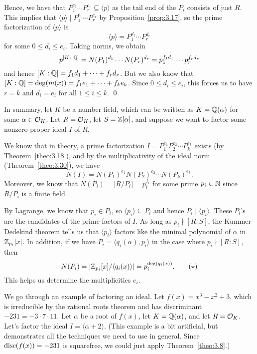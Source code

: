 \begin{pf}
    Hence, we have that $P_1^{e_1} \cdots P_r^{e_r} \subseteq \langle p \rangle$ 
    as the tail end of the $P_i$ consists of just $R$. This implies that 
    $\langle p \rangle \mid P_1^{e_1} \cdots P_r^{e_r}$ by Proposition~\ref{prop:3.17},
    so the prime factorization of $\langle p \rangle$ is 
    \[ \langle p \rangle = P_1^{d_1} \cdots P_r^{d_r} \] 
    for some $0 \leq d_i \leq e_i$. Taking norms, we obtain 
    \[ p^{[K\colon\mathbb{Q}]} = N(P_1)^{d_1} \cdots N(P_r)^{d_r} = p_1^{f_1d_1} \cdots p_r^{f_rd_r} \]  
    and hence $[K : \mathbb{Q}] = f_1d_1 + \cdots + f_rd_r$. But we also know that $[K : \mathbb{Q}] 
    = \deg(m(x)) = f_1e_1 + \cdots + f_ke_k$. Since $0 \leq d_i \leq e_i$, this forces us 
    to have $r = k$ and $d_i = e_i$ for all $1 \leq i \leq k$. \qed 
\end{pf}\vspace{-0.25cm}

In summary, let $K$ be a number field, which can be written as $K = \mathbb{Q}(\alpha)$ for some 
$\alpha \in {\cal O}_K$. Let $R = {\cal O}_K$, let $S = \mathbb{Z}[\alpha]$, and suppose 
we want to factor some nonzero proper ideal $I$ of $R$. 

We know that in theory, a prime factorization $I = P_1^{e_1} P_2^{e_2} \cdots P_k^{e_k}$ 
exists (by Theorem~\ref{theo:3.18}), and by the multiplicativity of the ideal norm
(Theorem~\ref{theo:3.30}), we have 
\[ N(I) = N(P_1)^{e_1} N(P_2)^{e_2} \cdots N(P_k)^{e_k}. \] 
Moreover, we know that $N(P_i) = |R/P_i| = p_i^{f_i}$ for some prime $p_i \in \mathbb{N}$ 
since $R/P_i$ is a finite field. 

By Lagrange, we know that $p_i \in P_i$, so $\langle p_i \rangle \subseteq P_i$ and hence 
$P_i \mid \langle p_i \rangle$. These $P_i$'s are the candidates of the prime factors 
of $I$. As long as $p_i \nmid [R : S]$, the Kummer-Dedekind theorem tells us that 
$\langle p_i \rangle$ factors like the minimal polynomial of $\alpha$ in $\mathbb{Z}_{p_i}[x]$. 
In addition, if we have $P_i = \langle q_i(\alpha), p_i \rangle$ in the case where 
$p_i \nmid [R : S]$, then 
\[ N(P_i) = |\mathbb{Z}_{p_i}[x]/\langle q_i(x) \rangle| = p_i^{\deg(q_i(x))}. 
\tag{$\star$} \] 
This helps us determine the multiplicities $e_i$. 

We go through an example of factoring an ideal. Let $f(x) = x^3 - x^2 + 3$, which is 
irreducible by the rational roots theorem and has discriminant $-231 = -3 \cdot 7 \cdot 11$.
Let $\alpha$ be a root of $f(x)$, let $K = \mathbb{Q}(\alpha)$, and let $R = {\cal O}_K$. 
Let's factor the ideal $I = \langle \alpha + 2 \rangle$. (This example is a 
bit artificial, but demonstrates all the techniques we need to use 
in general. Since $\operatorname{disc}(f(x)) = -231$ is squarefree, we could just apply 
Theorem~\ref{theo:3.8}.) 

